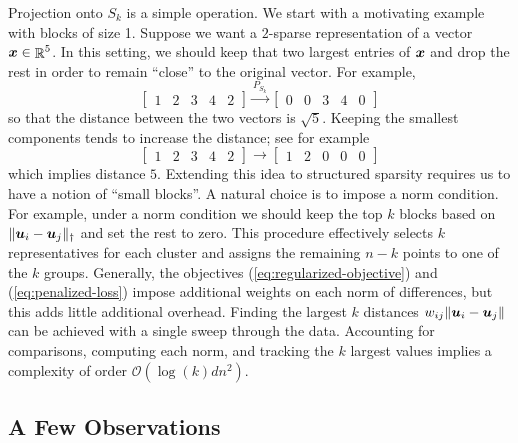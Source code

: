 \documentclass[11pt]{article}
\begin{document}
Projection onto \(S_{k}\) is a simple operation.
We start with a motivating example with blocks of size 1.
Suppose we want a \(2\)-sparse representation of a vector \(\boldsymbol{x} \in \mathop{\mathbb{R}}\nolimits^{5}\).
In this setting, we should keep that two largest entries of \(\boldsymbol{x}\) and drop the rest in order to remain ``close'' to the original vector.
For example,
\begin{equation*}
    \begin{bmatrix}
        1 & 2 & 3 & 4 & 2
    \end{bmatrix}
    \overset{P_{S_{k}}}{\longrightarrow}
    \begin{bmatrix}
        0 & 0 & 3 & 4 & 0
    \end{bmatrix}
\end{equation*}
so that the distance between the two vectors is \(\sqrt{5}\).
Keeping the smallest components tends to increase the distance; see for example
\begin{equation*}
    \begin{bmatrix}
        1 & 2 & 3 & 4 & 2
    \end{bmatrix}
    {\longrightarrow}
    \begin{bmatrix}
        1 & 2 & 0 & 0 & 0
    \end{bmatrix}
\end{equation*}
which implies distance \(5\).
Extending this idea to structured sparsity requires us to have a notion of ``small blocks''.
A natural choice is to impose a norm condition.
For example, under a norm condition we should keep the top $k$ blocks based on \(\|\boldsymbol{u}_{i} - \boldsymbol{u}_{j}\|_{\dagger}\) and set the rest to zero.
This procedure effectively selects $k$ representatives for each cluster and assigns the remaining $n - k$ points to one of the \(k\) groups.
Generally, the objectives (\ref{eq:regularized-objective}) and (\ref{eq:penalized-loss}) impose additional weights on each norm of differences, but this adds little additional overhead.
Finding the largest \(k\) distances \(w_{ij} \| \boldsymbol{u}_{i} - \boldsymbol{u}_{j} \|\) can be achieved with a single sweep through the data.
Accounting for comparisons, computing each norm, and tracking the \(k\) largest values implies a complexity of order \(\mathcal{O}(\log(k)dn^{2})\).

\subsection*{A Few Observations}
\end{document}
